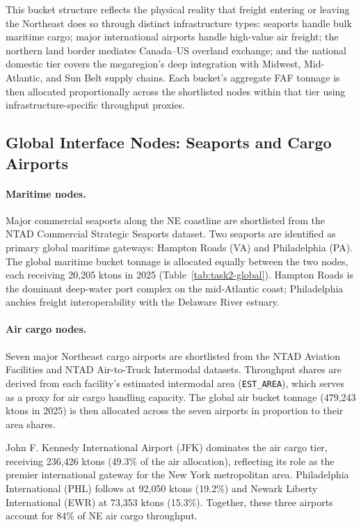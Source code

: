 This bucket structure reflects the physical reality that freight entering or leaving the
Northeast does so through distinct infrastructure types: seaports handle bulk maritime
cargo; major international airports handle high-value air freight; the northern land border
mediates Canada--US overland exchange; and the national domestic tier covers the
megaregion's deep integration with Midwest, Mid-Atlantic, and Sun Belt supply chains.
Each bucket's aggregate FAF tonnage is then allocated proportionally across the shortlisted
nodes within that tier using infrastructure-specific throughput proxies.

\subsection{Global Interface Nodes: Seaports and Cargo Airports}

\paragraph{Maritime nodes.}
Major commercial seaports along the NE coastline are shortlisted from the NTAD Commercial
Strategic Seaports dataset. Two seaports are identified as primary global maritime
gateways: Hampton Roads (VA) and Philadelphia (PA). The global maritime bucket tonnage
is allocated equally between the two nodes, each receiving 20{,}205 ktons in 2025
(Table~\ref{tab:task2-global}). Hampton Roads is the dominant deep-water port complex on
the mid-Atlantic coast; Philadelphia anchies freight interoperability with the Delaware
River estuary.

\paragraph{Air cargo nodes.}
Seven major Northeast cargo airports are shortlisted from the NTAD Aviation Facilities
and NTAD Air-to-Truck Intermodal datasets. Throughput shares are derived from
each facility's estimated intermodal area (\texttt{EST\_AREA}), which serves as a
proxy for air cargo handling capacity. The global air bucket tonnage (479{,}243 ktons
in 2025) is then allocated across the seven airports in proportion to their area shares.

John F. Kennedy International Airport (JFK) dominates the air cargo tier, receiving
236{,}426 ktons (49.3\% of the air allocation), reflecting its role as the premier
international gateway for the New York metropolitan area. Philadelphia International
(PHL) follows at 92{,}050 ktons (19.2\%) and Newark Liberty International (EWR) at
73{,}353 ktons (15.3\%). Together, these three airports account for 84\% of NE air
cargo throughput.

